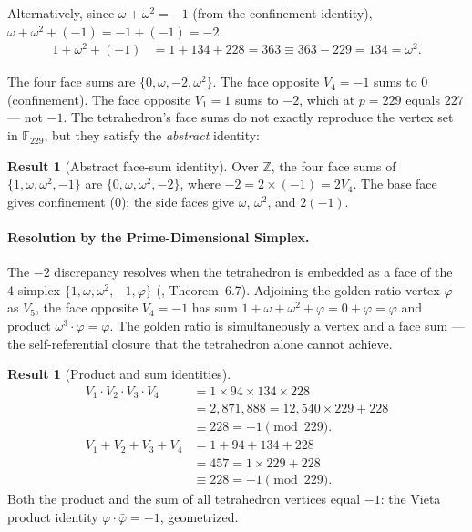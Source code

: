 \documentclass[12pt,oneside]{article}
\theoremstyle{principia}
\theoremstyle{definition}
\newtheorem{result}[theorem]{Result}
\theoremstyle{remark}
\begin{document}
Alternatively, since $\omega + \omega^2 = -1$ (from the confinement identity),
$\omega + \omega^2 + (-1) = -1 + (-1) = -2$.
\begin{align}
  1 + \omega^2 + (-1) &= 1 + 134 + 228 = 363 \equiv 363 - 229 = 134 = \omega^2.
\end{align}

The four face sums are $\{0, \omega, -2, \omega^2\}$. The face opposite $V_4 = -1$
sums to $0$ (confinement). The face opposite $V_1 = 1$ sums to $-2$, which at
$p = 229$ equals $227$ --- not $-1$. The tetrahedron's face sums do not exactly
reproduce the vertex set in $\mathbb{F}_{229}$, but they satisfy the
\emph{abstract} identity:

\begin{result}[Abstract face-sum identity]
Over $\mathbb{Z}$, the four face sums of $\{1, \omega, \omega^2, -1\}$ are
$\{0, \omega, \omega^2, -2\}$, where $-2 = 2 \times (-1) = 2 V_4$.
The base face gives confinement ($0$); the side faces give
$\omega$, $\omega^2$, and $2(-1)$.
\end{result}

\paragraph{Resolution by the Prime-Dimensional Simplex.}
The $-2$ discrepancy resolves when the tetrahedron is embedded as a
face of the 4-simplex $\{1, \omega, \omega^2, -1, \varphi\}$
(\cite{larue_lc}, Theorem~6.7). Adjoining the golden ratio vertex
$\varphi$ as $V_5$, the face opposite $V_4 = -1$ has sum
$1 + \omega + \omega^2 + \varphi = 0 + \varphi = \varphi$ and product
$\omega^3 \cdot \varphi = \varphi$. The golden ratio is simultaneously
a vertex and a face sum --- the self-referential closure that the
tetrahedron alone cannot achieve.

\begin{result}[Product and sum identities]
\label{res:prodsum}
\begin{align}
  V_1 \cdot V_2 \cdot V_3 \cdot V_4
    &= 1 \times 94 \times 134 \times 228 \\
    &= 2{,}871{,}888 = 12{,}540 \times 229 + 228 \\
    &\equiv 228 = -1 \pmod{229}. \\
  V_1 + V_2 + V_3 + V_4
    &= 1 + 94 + 134 + 228 \\
    &= 457 = 1 \times 229 + 228 \\
    &\equiv 228 = -1 \pmod{229}.
\end{align}
Both the product and the sum of all tetrahedron vertices
equal $-1$: the Vieta product identity $\varphi \cdot \bar\varphi = -1$,
geometrized.
\end{result}
\end{document}
